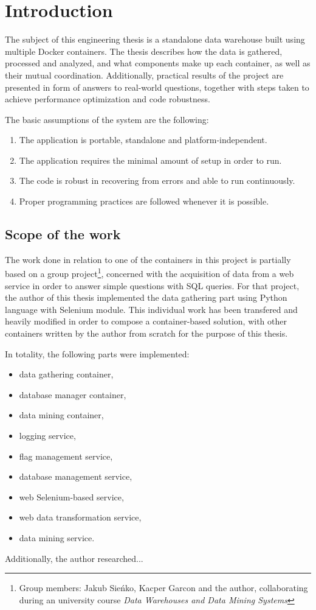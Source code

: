 \chapter{Introduction}
\label{ch:intro}
The subject of this engineering thesis is a standalone data warehouse built using multiple Docker containers. The thesis describes how the data is gathered, processed and analyzed, and what components make up each container, as well as their mutual coordination. Additionally, practical results of the project are presented in form of answers to real-world questions, together with steps taken to achieve performance optimization and code robustness. \par
The basic assumptions of the system are the following:
\begin{enumerate}
    \item The application is portable, standalone and platform-independent.
    \item The application requires the minimal amount of setup in order to run.
    \item The code is robust in recovering from errors and able to run continuously.
    \item Proper programming practices are followed whenever it is possible.
\end{enumerate}


\section{Scope of the work}
The work done in relation to one of the containers in this project is partially based on a group project\footnote{Group members: Jakub Sieńko, Kacper Garcon and the author, collaborating during an university course \textit{Data Warehouses and Data Mining Systems}}, concerned with the acquisition of data from a web service in order to answer simple questions with SQL queries. For that project, the author of this thesis implemented the data gathering part using Python language with Selenium module. This individual work has been transfered and heavily modified in order to compose a container-based solution, with other containers written by the author from scratch for the purpose of this thesis. \par
In totality, the following parts were implemented:
\begin{itemize}
    \item data gathering container,
    \item database manager container,
    \item data mining container,
    \item logging service,
    \item flag management service,
    \item database management service,
    \item web Selenium-based service,
    \item web data transformation service,
    \item data mining service.
\end{itemize}
Additionally, the author researched...



